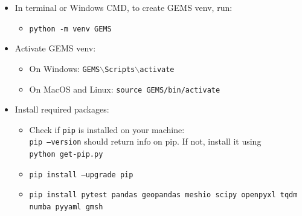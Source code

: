 \begin{enumerate}
\begin{itemize}
\begin{itemize}
            \item In terminal or Windows CMD, to create GEMS venv, run:
                \begin{itemize}
                    \item {\texttt{python -m venv GEMS }}
                \end{itemize}
            \item Activate GEMS venv:
                \begin{itemize}
                    \item On Windows: \texttt{GEMS$\backslash$Scripts$\backslash$activate} 
                    \item On MacOS and Linux: \texttt{source GEMS/bin/activate}
                \end{itemize}
            \item Install required packages: 
                \begin{itemize}
                    \item Check if {\tt pip} is installed on your machine:\\ {\tt pip --version} should return info on pip. If not, install it using \\ {\tt python get-pip.py}
                    \item \texttt{pip install --upgrade pip}
                    \item \texttt{pip install pytest pandas geopandas meshio scipy openpyxl tqdm numba pyyaml gmsh }
                \end{itemize}
            \end{itemize}
    \end{itemize}
\end{enumerate}


